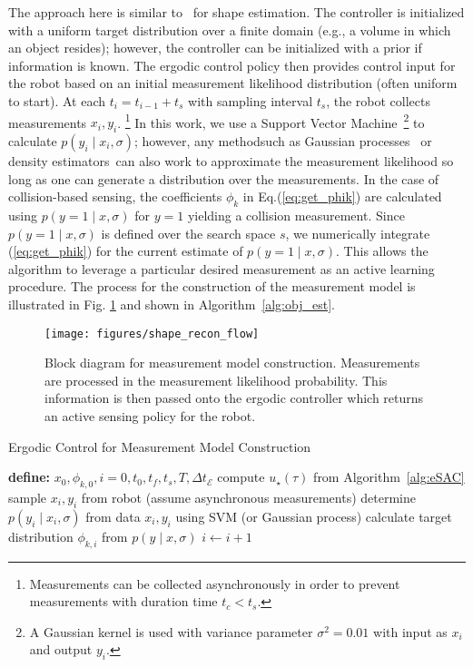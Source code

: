 \documentclass[conference]{IEEEtran}
\begin{document}
The approach here is similar to~\cite{abrahamRAL17} for shape estimation. 
The controller is initialized with a uniform target distribution over a finite domain (e.g., a volume in which an object resides); however, the controller can be initialized with a prior if information is known. 
The ergodic control policy then provides control input for the robot based on an initial measurement likelihood distribution (often uniform to start).
At each $t_i = t_{i-1} + t_s$ with sampling interval $t_s$, the robot collects measurements $x_i, y_i$. \footnote{Measurements can be collected asynchronously in order to prevent measurements with duration time $t_c < t_s$.}
In this work, we use a Support Vector Machine~\cite{platt1999probabilistic, wu2004probability, vapnik1998statistical}\footnote{A Gaussian kernel is used with variance parameter $\sigma^2 = 0.01$ with input as $x_i$ and output $y_i$.} to calculate $p(y_i \mid x_i, \sigma)$; however, any method\textemdash such as Gaussian processes~\cite{krause2007nonmyopic,matsubara2016active} or density estimators~\cite{silverman2018density}\textemdash can also work to approximate the measurement likelihood so long as one can generate a distribution over the measurements.
In the case of collision-based sensing, the coefficients $\phi_k$ in Eq.(\ref{eq:get_phik}) are calculated using $p(y=1 \mid x, \sigma)$ for $y=1$ yielding a collision measurement.
Since $p(y=1 \mid x, \sigma)$ is defined over the search space $s$, we numerically integrate (\ref{eq:get_phik}) for the current estimate of $p(y=1 \mid x, \sigma)$.
This allows the algorithm to leverage a particular desired measurement as an active learning procedure.  
The process for the construction of the measurement model is illustrated in Fig. \ref{shapeReconFlow} and shown in Algorithm~\ref{alg:obj_est}. 


\begin{figure}[]
\texttt{[image: figures/shape\_recon\_flow]}
\caption{ Block diagram for measurement model construction. Measurements are processed in the measurement likelihood probability. 
This information is then passed onto the ergodic controller which returns an active sensing policy for the robot. }
\vspace{-2mm}
\label{shapeReconFlow}
\end{figure}

\begin{algorithm}
\caption{Ergodic Control for Measurement Model Construction} \label{alg:obj_est}
\centering
\begin{algorithmic}[1]
\State \textbf{define:} $x_0, \phi_{k,0}, i=0, t_0, t_f, t_s, T, \Delta t_\mathcal{E}$
\State compute $u_\star(\tau)$ from Algorithm~\ref{alg:eSAC}
\State sample $x_i, y_i$ from robot (assume asynchronous measurements)
\State determine $p(y_i \mid x_i, \sigma)$ from data $x_i, y_i$ using SVM (or Gaussian process)
\State calculate target distribution $\phi_{k,i}$ from $p(y \mid x, \sigma)$
\State $i \gets i +1$
\EndWhile
\end{algorithmic}
\end{algorithm}
\end{document}
